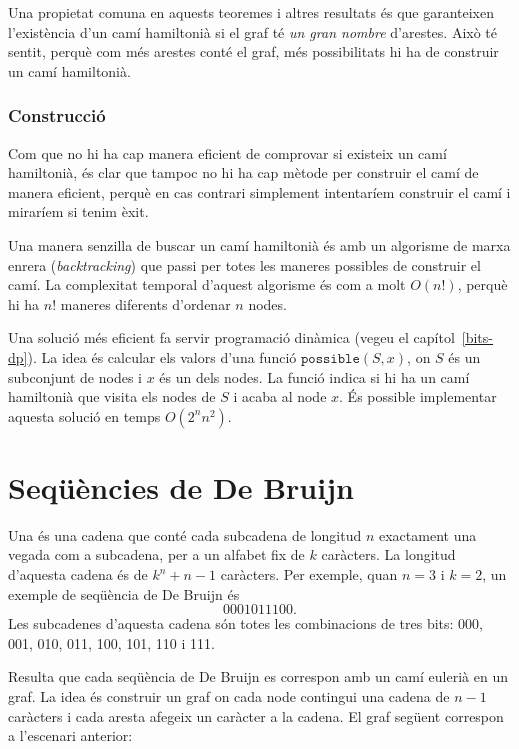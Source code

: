 Una propietat comuna en aquests teoremes i altres resultats és que
garanteixen l'existència d'un camí hamiltonià si el graf té \emph{un
gran nombre} d'arestes. Això té sentit, perquè com més arestes conté
el graf, més possibilitats hi ha de construir un camí hamiltonià.

\subsubsection{Construcció}

Com que no hi ha cap manera eficient de comprovar si existeix un camí
hamiltonià, és clar que tampoc no hi ha cap mètode per construir el
camí de manera eficient, perquè en cas contrari simplement intentaríem
construir el camí i miraríem si tenim èxit.

Una manera senzilla de buscar un camí hamiltonià és amb un algorisme
de marxa enrera (\emph{backtracking}) que passi per totes les maneres
possibles de construir el camí. La complexitat temporal d'aquest
algorisme és com a molt $O(n!)$, perquè hi ha $n!$ maneres diferents
d'ordenar $n$ nodes.

Una solució més eficient fa servir programació dinàmica (vegeu el
capítol~\ref{bits-dp}). La idea és calcular els valors d'una funció
$\texttt{possible}(S,x)$, on $S$ és un subconjunt de nodes i $x$ és un
dels nodes. La funció indica si hi ha un camí hamiltonià que visita
els nodes de $S$ i acaba al node $x$. És possible implementar aquesta
solució en temps $O(2^n n^2)$.

\section{Seqüències de De Bruijn}


Una  és una cadena que conté cada subcadena
de longitud $n$ exactament una vegada com a subcadena, per a un
alfabet fix de $k$ caràcters. La longitud d'aquesta cadena és de
$k^n+n-1$ caràcters. Per exemple, quan $n=3$ i $k=2$, un exemple de
seqüència de De Bruijn és
\[0001011100.\]
Les subcadenes d'aquesta cadena són totes les combinacions de tres bits:
000, 001, 010, 011, 100, 101, 110 i 111.

Resulta que cada seqüència de De Bruijn es correspon amb un camí eulerià en
un graf. La idea és construir un graf on cada node contingui una
cadena de $n-1$ caràcters i cada aresta afegeix un caràcter a la
cadena. El graf següent correspon a l'escenari anterior:


